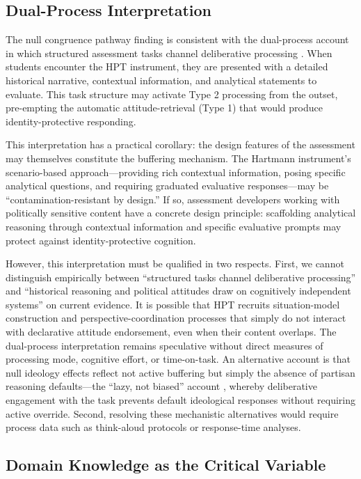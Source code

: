 \documentclass[referee,pdflatex,sn-apa]{sn-jnl}
\begin{document}
\subsection{Dual-Process Interpretation}\label{subsec:dualprocessdiscussion}

The null congruence pathway finding is consistent with the dual-process account in which structured assessment tasks channel deliberative processing \citep{Evans2013}. When students encounter the HPT instrument, they are presented with a detailed historical narrative, contextual information, and analytical statements to evaluate. This task structure may activate Type 2 processing from the outset, pre-empting the automatic attitude-retrieval (Type 1) that would produce identity-protective responding.

This interpretation has a practical corollary: the design features of the assessment may themselves constitute the buffering mechanism. The Hartmann instrument's scenario-based approach---providing rich contextual information, posing specific analytical questions, and requiring graduated evaluative responses---may be ``contamination-resistant by design.'' If so, assessment developers working with politically sensitive content have a concrete design principle: scaffolding analytical reasoning through contextual information and specific evaluative prompts may protect against identity-protective cognition.

However, this interpretation must be qualified in two respects. First, we cannot distinguish empirically between ``structured tasks channel deliberative processing'' and ``historical reasoning and political attitudes draw on cognitively independent systems'' on current evidence. It is possible that HPT recruits situation-model construction and perspective-coordination processes that simply do not interact with declarative attitude endorsement, even when their content overlaps. The dual-process interpretation remains speculative without direct measures of processing mode, cognitive effort, or time-on-task. An alternative account is that null ideology effects reflect not active buffering but simply the absence of partisan reasoning defaults---the ``lazy, not biased'' account \citep{PennycookRand2019}, whereby deliberative engagement with the task prevents default ideological responses without requiring active override. Second, resolving these mechanistic alternatives would require process data such as think-aloud protocols or response-time analyses.

\subsection{Domain Knowledge as the Critical Variable}\label{subsec:knowledge}
\end{document}

